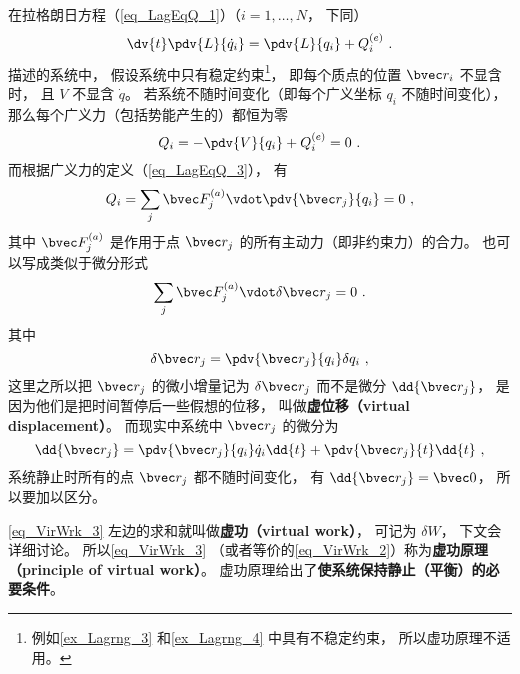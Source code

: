 
\begin{issues}
\issueTODO
\end{issues}


在拉格朗日方程（\autoref{eq_LagEqQ_1}）（$i=1,\dots,N$， 下同）
\begin{equation}\label{eq_VirWrk_1}
\dv{t} \pdv{L}{\dot q_i} = \pdv{L}{q_i} + Q_i^{(e)}~.
\end{equation}
描述的系统中， 假设系统中只有稳定约束\footnote{例如\autoref{ex_Lagrng_3} 和\autoref{ex_Lagrng_4} 中具有不稳定约束， 所以虚功原理不适用。}， 即每个质点的位置 $\bvec r_i$ 不显含时， 且 $V$ 不显含 $\dot q$。 若系统不随时间变化（即每个广义坐标 $q_i$ 不随时间变化）， 那么每个广义力（包括势能产生的）都恒为零
\begin{equation}\label{eq_VirWrk_2}
Q_i = -\pdv{V}{q_i} + Q_i^{(e)} = 0~.
\end{equation}
而根据广义力的定义（\autoref{eq_LagEqQ_3}）， 有
\begin{equation}
Q_i = \sum_j \bvec F_j^{(a)} \vdot \pdv{\bvec r_j}{q_i} = 0~,
\end{equation}
其中 $\bvec F_j^{(a)}$ 是作用于点 $\bvec r_j$ 的所有主动力（即非约束力）的合力。 也可以写成类似于微分形式
\begin{equation}\label{eq_VirWrk_3}
\sum_j \bvec F_j^{(a)} \vdot \delta \bvec r_j = 0~.
\end{equation}
其中
\begin{equation}
\delta \bvec r_j = \pdv{\bvec r_j}{q_i}\delta{q_i}~,
\end{equation}
这里之所以把 $\bvec r_j$ 的微小增量记为 $\delta \bvec r_j$ 而不是微分 $\dd{\bvec r_j}$， 是因为他们是把时间暂停后一些假想的位移， 叫做\textbf{虚位移（virtual displacement）}。 而现实中系统中 $\bvec r_j$ 的微分为
\begin{equation}
\dd{\bvec r_j} = \pdv{\bvec r_j}{q_i}\dot{q}_i\dd{t} + \pdv{\bvec r_j}{t}\dd{t}~,
\end{equation}
系统静止时所有的点 $\bvec r_j$ 都不随时间变化， 有 $\dd{\bvec r_j} = \bvec 0$， 所以要加以区分。

\autoref{eq_VirWrk_3} 左边的求和就叫做\textbf{虚功（virtual work）}， 可记为 $\delta W$， 下文会详细讨论。 所以\autoref{eq_VirWrk_3} （或者等价的\autoref{eq_VirWrk_2}）称为\textbf{虚功原理（principle of virtual work）}。 虚功原理给出了\textbf{使系统保持静止（平衡）的必要条件}。

